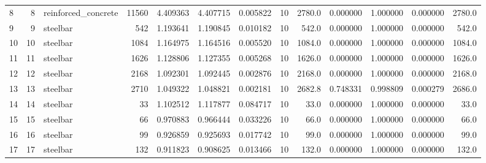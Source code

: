 \begin{tabular}{lrlrrrrrrrrrr}
8  &           8 &  reinforced\_concrete &          11560 &       4.409363 &         4.407715 &      0.005822 &           10 &             2780.0 &          0.000000 &                   1.000000 &                  0.000000 &                    2780.0 \\
9  &           9 &             steelbar &            542 &       1.193641 &         1.190845 &      0.010182 &           10 &              542.0 &          0.000000 &                   1.000000 &                  0.000000 &                     542.0 \\
10 &          10 &             steelbar &           1084 &       1.164975 &         1.164516 &      0.005520 &           10 &             1084.0 &          0.000000 &                   1.000000 &                  0.000000 &                    1084.0 \\
11 &          11 &             steelbar &           1626 &       1.128806 &         1.127355 &      0.005268 &           10 &             1626.0 &          0.000000 &                   1.000000 &                  0.000000 &                    1626.0 \\
12 &          12 &             steelbar &           2168 &       1.092301 &         1.092445 &      0.002876 &           10 &             2168.0 &          0.000000 &                   1.000000 &                  0.000000 &                    2168.0 \\
13 &          13 &             steelbar &           2710 &       1.049322 &         1.048821 &      0.002181 &           10 &             2682.8 &          0.748331 &                   0.998809 &                  0.000279 &                    2686.0 \\
14 &          14 &             steelbar &             33 &       1.102512 &         1.117877 &      0.084717 &           10 &               33.0 &          0.000000 &                   1.000000 &                  0.000000 &                      33.0 \\
15 &          15 &             steelbar &             66 &       0.970883 &         0.966444 &      0.033226 &           10 &               66.0 &          0.000000 &                   1.000000 &                  0.000000 &                      66.0 \\
16 &          16 &             steelbar &             99 &       0.926859 &         0.925693 &      0.017742 &           10 &               99.0 &          0.000000 &                   1.000000 &                  0.000000 &                      99.0 \\
17 &          17 &             steelbar &            132 &       0.911823 &         0.908625 &      0.013466 &           10 &              132.0 &          0.000000 &                   1.000000 &                  0.000000 &                     132.0 \\
\bottomrule
\end{tabular}
